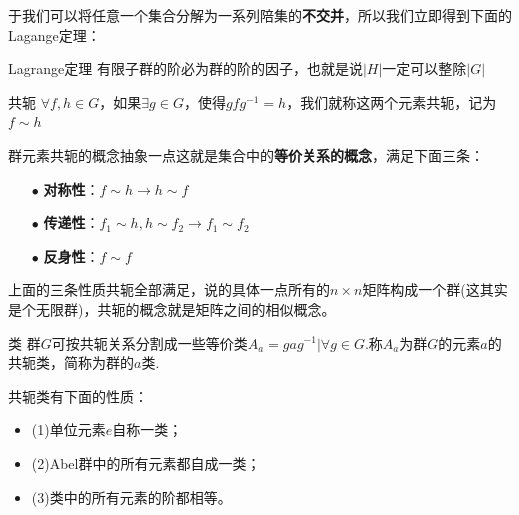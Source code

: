 于我们可以将任意一个集合分解为一系列陪集的\textbf{不交并}，所以我们立即得到下面的Lagange定理：
\begin{theorem}{Lagrange定理}
    有限子群的阶必为群的阶的因子，也就是说$|H|$一定可以整除$|G|$
\end{theorem}
\begin{define}{共轭}
    $\forall f,h\in G$，如果$\exists g\in G$，使得$gfg^{-1}=h$，我们就称这两个元素共轭，记为$f\sim h$
\end{define}
群元素共轭的概念抽象一点这就是集合中的\textbf{等价关系的概念}，满足下面三条：
\begin{itemize}
    \item[$\bullet$] \textbf{对称性}：$f\sim h\rightarrow h\sim f$
    \item[$\bullet$] \textbf{传递性}：$f_1\sim h,h\sim f_2\rightarrow f_1\sim f_2$
    \item[$\bullet$] \textbf{反身性}：$f\sim f$
\end{itemize}
上面的三条性质共轭全部满足，说的具体一点所有的$n\times n$矩阵构成一个群(这其实是个无限群)，共轭的概念就是矩阵之间的相似概念。
\begin{define}{类}
    群$G$可按共轭关系分割成一些等价类$A_a={gag^{-1}|\forall g\in G}$.称$A_a$为群$G$的元素$a$的共轭类，简称为群的$a$类.
\end{define}
共轭类有下面的性质：
\begin{itemize}
    \item (1)单位元素$e$自称一类；
    \item (2)Abel群中的所有元素都自成一类；
    \item (3)类中的所有元素的阶都相等。
\end{itemize}

